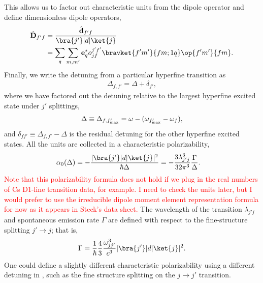 This allows us to factor out characteristic units from the dipole operator and define dimensionless dipole operators,
	\begin{align}
		\hat{ \mathbf{D}}_{f' f} & = \frac{ \hat{ \mathbf{d} }_{f' f} }{\bra{ j' }| d | \ket{ j } } \\
		& = \sum_q \sum_{m, m'} \mathbf{e}_q^* o^{j' f'}_{j f} \bravket{f' m'}{f m; 1 q} \op{f' m'}{f m}. 
	\end{align}
Finally, we write the detuning from a particular hyperfine transition as
	\begin{align}
		\Delta_{f,f'} = \Delta + \delta_{f'},
	\end{align}
where we have factored out the detuning relative to the largest hyperfine excited state under $ j' $ splittings,
	\begin{align} \label{Eq::DetuningChoice}
		\Delta \equiv \Delta_{f,f'_{\rm max}} = \omega - ( \omega_{f'_{\rm max}} - \omega_f),
	\end{align} 
and $\delta_{f f'} \equiv \Delta_{f,f'} - \Delta$ is the residual detuning for the other hyperfine excited states.  All the units are collected in a characteristic polarizability,
	\begin{align} \label{Eq::alpha0}
		\alpha_0(\Delta) & =  -\frac{|  \bra{ j' }| d | \ket{ j } |^2}{\hbar \Delta } = - \frac{3 \lambda_{j' j}^3}{32 \pi^3} \frac{ \Gamma }{ \Delta }.
	\end{align}
\textcolor{red}{Note that this polarizability formula does not hold if we plug in the real numbers of Cs D1-line transition data, for example. I need to check the units later, but I would prefer to use the irreducible dipole moment element representation formula for now as it appears in Steck's data sheet.} The wavelength of the transition $\lambda_{j' j}$ and spontaneous emission rate $\Gamma$ are defined with respect to the fine-structure splitting $j' \rightarrow j$; that is,
	\begin{align}
		\Gamma = \frac{1}{\hbar} \frac{4}{3} \frac{\omega_{j j'}^3}{c^3} | \bra{ j' }| d | \ket{ j } |^2.
	\end{align}
One could define a slightly different characteristic polarizability using a different detuning in , such as the fine structure splitting on the $j \rightarrow j'$ transition.

